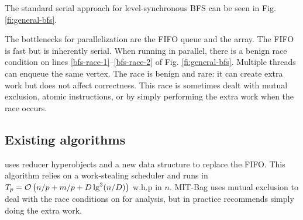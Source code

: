 The standard serial approach for level-synchronous BFS can be seen in Fig. \ref{fi:general-bfs}.

The bottlenecks for parallelization are the FIFO queue and the  array.  The FIFO is fast but is inherently serial.  When running in parallel, there is a benign race condition on lines \ref{bfs-race-1}--\ref{bfs-race-2} of Fig. \ref{fi:general-bfs}.  Multiple threads can enqueue the same vertex.  The race is benign and rare: it can create extra work but does not affect correctness.  This race is sometimes dealt with mutual exclusion, atomic instructions, or by simply performing the extra work when the race occurs.

\subsection*{Existing algorithms}
\cite{mit-bag} uses reducer hyperobjects and a new  data structure to replace the FIFO.
This algorithm relies on a work-stealing scheduler and runs in $T_p = {\mathcal O}\left({n/p+m/p+D\lg^3(n/D)}\right)$ w.h.p in $n$.
MIT-Bag uses mutual exclusion to deal with the race conditions on  for analysis, but in practice recommends simply doing the extra work.

